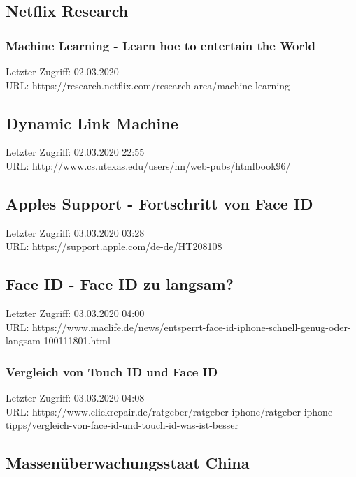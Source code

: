 \subsection{Netflix Research}
\label{Netlfix_Research}
	\subsubsection{Machine Learning - Learn hoe to entertain the World}
	\label{Netflix_Research:machine_learning_learn_how_to_entertain_the_world}
	Letzter Zugriff: 02.03.2020\\
	URL: https://research.netflix.com/research-area/machine-learning

\subsection{Dynamic Link Machine}
\label{subsec:dynamic_link_machine}
	Letzter Zugriff: 02.03.2020 22:55\\
	URL: http://www.cs.utexas.edu/users/nn/web-pubs/htmlbook96/

\subsection{Apples Support - Fortschritt von Face ID}
\label{apple:face_id}
	Letzter Zugriff: 03.03.2020 03:28\\
	URL: https://support.apple.com/de-de/HT208108

\subsection{Face ID - Face ID zu langsam?}
\label{maclife:face_id_too_slow}
	Letzter Zugriff: 03.03.2020 04:00\\
	URL: https://www.maclife.de/news/entsperrt-face-id-iphone-schnell-genug-oder-langsam-100111801.html

	\subsubsection{Vergleich von Touch ID und Face ID}
	\label{cickrepair:touch_id_vs_face_id}
		Letzter Zugriff: 03.03.2020 04:08\\
		URL: https://www.clickrepair.de/ratgeber/ratgeber-iphone/ratgeber-iphone-tipps/vergleich-von-face-id-und-touch-id-was-ist-besser

\subsection{Massenüberwachungsstaat China}
